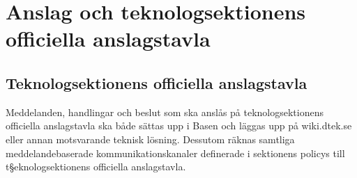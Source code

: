 \section{Anslag och teknologsektionens officiella anslagstavla}
\subsection{Teknologsektionens officiella anslagstavla}
Meddelanden, handlingar och beslut som ska anslås på teknologsektionens
officiella anslagstavla ska både sättas upp i Basen och läggas upp på
wiki.dtek.se eller annan motsvarande teknisk lösning. 
Dessutom räknas samtliga meddelandebaserade kommunikationskanaler definerade i sektionens policys till t§eknologsektionens officiella anslagstavla.
